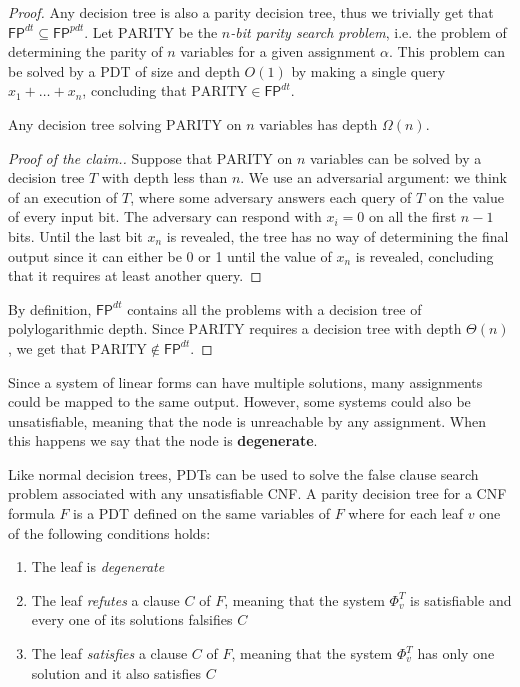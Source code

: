 \begin{proof}
 Any decision tree is also a parity decision tree, thus we trivially get that $\mathsf{FP}^{dt} \subseteq \mathsf{FP}^{pdt}$. Let $\mathrm{PARITY}$ be the \textit{$n$-bit parity search problem}, i.e. the problem of determining the parity of $n$ variables for a given assignment $\alpha$. This problem can be solved by a PDT of size and depth $O(1)$ by making a single query $x_1 + \ldots + x_n$, concluding that $\mathrm{PARITY} \in \mathsf{FP}^{dt}$.
    
    \begin{claim}
 Any decision tree solving $\mathrm{PARITY}$ on $n$ variables has depth $\Omega(n)$.
    \end{claim}

    \begin{proof}[Proof of the claim.]
 Suppose that $\mathrm{PARITY}$ on $n$ variables can be solved by a decision tree $T$ with depth less than $n$. We use an adversarial argument: we think of an execution
 of $T$, where some adversary answers each query of $T$ on the value of every input bit. The adversary can respond with $x_i = 0$ on all the first $n-1$ bits. Until the last bit $x_n$ is revealed, the tree has no way of determining the final output since it can either be 0 or 1 until the value of $x_n$ is revealed, concluding that it requires at least another query.
    \end{proof}
    
 By definition, $\mathsf{FP}^{dt}$ contains all the problems with a decision tree of polylogarithmic depth. Since $\mathrm{PARITY}$ requires a decision tree with depth $\Theta(n)$, we get that $\mathrm{PARITY} \notin \mathsf{FP}^{dt}$.
\end{proof}

Since a system of linear forms can have multiple solutions, many assignments could be mapped to the same output. However, some systems could also be unsatisfiable, meaning that the node is unreachable by any assignment. When this happens we say that the node is \textbf{degenerate}.

Like normal decision trees, PDTs can be used to solve the false clause search problem associated with any unsatisfiable CNF. A parity decision tree for a CNF formula $F$ is a PDT defined on the same variables of $F$ where for each leaf $v$ one of the following conditions holds:
\begin{enumerate}[itemsep=0em]
    \item The leaf is \textit{degenerate}
    \item The leaf \textit{refutes} a clause $C$ of $F$, meaning that the system $\Phi_v^T$ is satisfiable and every one of its solutions falsifies $C$
    \item The leaf \textit{satisfies} a clause $C$ of $F$, meaning that the system $\Phi_v^T$ has only one solution and it also satisfies $C$
\end{enumerate}

